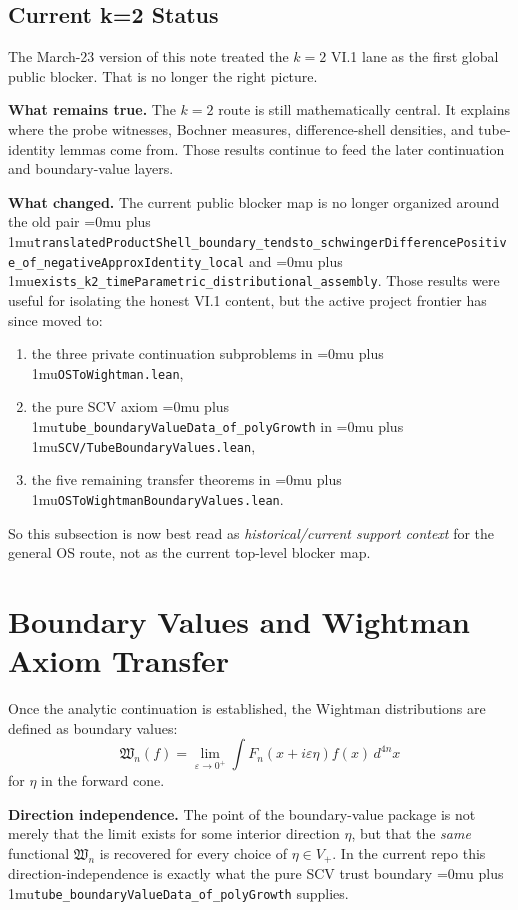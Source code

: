 \documentclass[11pt,a4paper]{article}
\newcommand{\leanfile}[1]{\begingroup\Urlmuskip=0mu plus 1mu\relax\nolinkurl{#1}\endgroup}
\newcommand{\leanname}[1]{\begingroup\Urlmuskip=0mu plus 1mu\relax\nolinkurl{#1}\endgroup}
\begin{document}
\subsection{Current k=2 Status}
\label{sec:k2sorry}

The March-23 version of this note treated the $k=2$ VI.1 lane as the first
global public blocker. That is no longer the right picture.

\medskip\noindent
\textbf{What remains true.}
The $k=2$ route is still mathematically central. It explains where the probe
witnesses, Bochner measures, difference-shell densities, and tube-identity
lemmas come from. Those results continue to feed the later continuation and
boundary-value layers.

\medskip\noindent
\textbf{What changed.}
The current public blocker map is no longer organized around the old pair
\leanname{translatedProductShell\_boundary\_tendsto\_schwingerDifferencePositive\_of\_negativeApproxIdentity\_local}
and \leanname{exists\_k2\_timeParametric\_distributional\_assembly}. Those
results were useful for isolating the honest VI.1 content, but the active
project frontier has since moved to:
\begin{enumerate}
\item the three private continuation subproblems in
  \leanfile{OSToWightman.lean},
\item the pure SCV axiom \leanname{tube\_boundaryValueData\_of\_polyGrowth} in
  \leanfile{SCV/TubeBoundaryValues.lean},
\item the five remaining transfer theorems in
  \leanfile{OSToWightmanBoundaryValues.lean}.
\end{enumerate}

\medskip\noindent
So this subsection is now best read as \emph{historical/current support context}
for the general OS route, not as the current top-level blocker map.


\section{Boundary Values and Wightman Axiom Transfer}

Once the analytic continuation is established, the Wightman distributions are
defined as boundary values:
\[
\mathfrak{W}_n(f) = \lim_{\varepsilon \to 0^+}
\int F_n(x + i\varepsilon\eta) f(x) \, d^{4n}x
\]
for $\eta$ in the forward cone.

\medskip\noindent
\textbf{Direction independence.}
The point of the boundary-value package is not merely that the limit exists for
some interior direction \(\eta\), but that the \emph{same} functional
\(\mathfrak{W}_n\) is recovered for every choice of \(\eta \in V_+\). In the
current repo this direction-independence is exactly what the pure SCV trust
boundary \leanname{tube\_boundaryValueData\_of\_polyGrowth} supplies.
\end{document}
